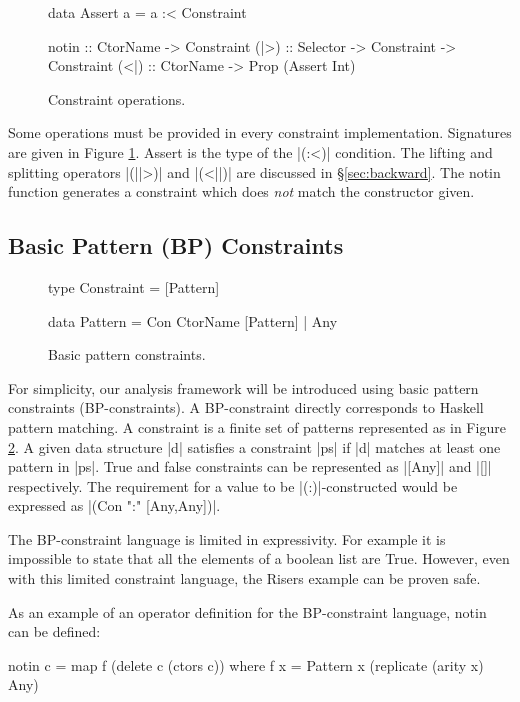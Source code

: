 \documentclass[preprint]{sigplanconf}
\newcommand{\C}[1]{\textsf{#1}}
\begin{document}
\begin{figure}
\begin{code}
data Assert a = a :< Constraint

notin :: CtorName -> Constraint
(|>) :: Selector -> Constraint -> Constraint
(<|) :: CtorName -> Prop (Assert Int)
\end{code}
\caption{Constraint operations.}
\label{fig:constraint}
\end{figure}

Some operations must be provided in every constraint implementation. Signatures are given in Figure \ref{fig:constraint}. \C{Assert} is the type of the |(:<)| condition. The lifting and splitting operators |(||>)| and |(<||)| are discussed in \S\ref{sec:backward}. The \C{notin} function generates a constraint which does \textit{not} match the constructor given.


\subsection{Basic Pattern (BP) Constraints}
\label{sec:basic}

\begin{figure}
\begin{code}
type Constraint = [Pattern]

data Pattern  =  Con CtorName [Pattern]
              |  Any
\end{code}
\caption{Basic pattern constraints.}
\label{fig:basic}
\end{figure}

For simplicity, our analysis framework will be introduced using basic pattern constraints (BP-constraints). A BP-constraint directly corresponds to Haskell pattern matching. A constraint is a finite set of patterns represented as in Figure \ref{fig:basic}. A given data structure |d| satisfies a constraint |ps| if |d| matches at least one pattern in |ps|. True and false constraints can be represented as |[Any]| and |[]| respectively. The requirement for a value to be |(:)|-constructed would be expressed as |(Con ":" [Any,Any])|.
 
The BP-constraint language is limited in expressivity. For example it is impossible to state that all the elements of a boolean list are True. However, even with this limited constraint language, the Risers example can be proven safe.

As an example of an operator definition for the BP-constraint language, \C{notin} can be defined:

\begin{code}
notin c = map f (delete c (ctors c))
   where f x = Pattern x (replicate (arity x) Any)
\end{code}
\end{document}
